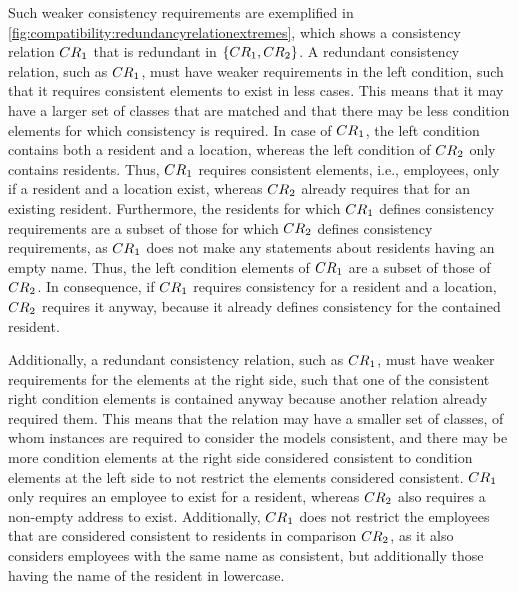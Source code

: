 \begin{example}
Such weaker consistency requirements are exemplified in \autoref{fig:compatibility:redundancyrelationextremes}, which shows a consistency relation $\consistencyrelation{CR}{1}$ that is redundant in $\setted{\consistencyrelation{CR}{1}, \consistencyrelation{CR}{2}}$.
A redundant consistency relation, such as $\consistencyrelation{CR}{1}$, must have weaker requirements in the left condition, such that it requires consistent elements to exist in less cases.
This means that it may have a larger set of classes that are matched and that there may be less condition elements for which consistency is required.
In case of $\consistencyrelation{CR}{1}$, the left condition contains both a resident and a location, whereas the left condition of $\consistencyrelation{CR}{2}$ only contains residents.
Thus, $\consistencyrelation{CR}{1}$ requires consistent elements, i.e., employees, only if a resident and a location exist, whereas $\consistencyrelation{CR}{2}$ already requires that for an existing resident.
Furthermore, the residents for which $\consistencyrelation{CR}{1}$ defines consistency requirements are a subset of those for which $\consistencyrelation{CR}{2}$ defines consistency requirements, as $\consistencyrelation{CR}{1}$ does not make any statements about residents having an empty name.
Thus, the left condition elements of $\consistencyrelation{CR}{1}$ are a subset of those of $\consistencyrelation{CR}{2}$.
In consequence, if $\consistencyrelation{CR}{1}$ requires consistency for a resident and a location, $\consistencyrelation{CR}{2}$ requires it anyway, because it already defines consistency for the contained resident.

Additionally, a redundant consistency relation, such as $\consistencyrelation{CR}{1}$, must have weaker requirements for the  elements at the right side, such that one of the consistent right condition elements is contained anyway because another relation already required them. 
This means that the relation may have a smaller set of classes, of whom instances are required to consider the models consistent, and there may be more condition elements at the right side considered consistent to condition elements at the left side to not restrict the elements considered consistent.
$\consistencyrelation{CR}{1}$ only requires an employee to exist for a resident, whereas $\consistencyrelation{CR}{2}$ also requires a non-empty address to exist. Additionally, $\consistencyrelation{CR}{1}$ does not restrict the employees that are considered consistent to residents in comparison $\consistencyrelation{CR}{2}$, as it also considers employees with the same name as consistent, but additionally those having the name of the resident in lowercase.
\end{example}

